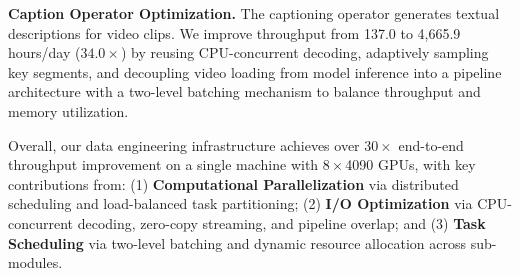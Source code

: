 \textbf{Caption Operator Optimization.} The captioning operator generates textual descriptions for video clips. We improve throughput from 137.0 to 4,665.9 hours/day ($34.0\times$) by reusing CPU-concurrent decoding, adaptively sampling key segments, and decoupling video loading from model inference into a pipeline architecture with a two-level batching mechanism to balance throughput and memory utilization.


Overall, our data engineering infrastructure achieves over $30\times$ end-to-end throughput improvement on a single machine with $8\times$4090 GPUs, with key contributions from: (1) \textbf{Computational Parallelization} via distributed scheduling and load-balanced task partitioning; (2) \textbf{I/O Optimization} via CPU-concurrent decoding, zero-copy streaming, and pipeline overlap; and (3) \textbf{Task Scheduling} via two-level batching and dynamic resource allocation across sub-modules.
